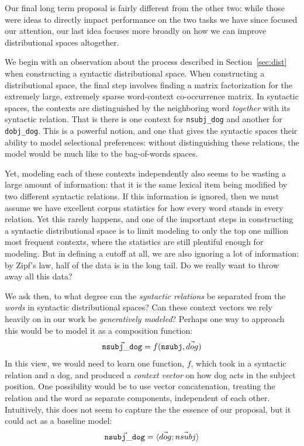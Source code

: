 \documentclass[12pt]{article}
\begin{document}
Our final long term proposal is fairly different from the other two: while
those were ideas to directly impact performance on the two tasks we have
since focused our attention, our last idea focuses more broadly on how
we can improve distributional spaces altogether.

We begin with an observation about the process described in
Section~\ref{sec:dist} when constructing a syntactic distributional space.
When constructing a distributional space, the final step involves finding a
matrix factorization for the extremely large, extremely sparse word-context
co-occurrence matrix. In syntactic spaces, the contexts are distinguished by
the neighboring word {\em together} with its syntactic relation. That is there
is one context for {\tt nsubj\_dog} and another for {\tt dobj\_dog}. This is a
powerful notion, and one that gives the syntactic spaces their ability
to model selectional preferences: without distinguishing these relations,
the model would be much like to the bag-of-words spaces.

Yet, modeling each of these contexts independently also seems to be wasting
a large amount of information: that it is the same lexical item being modified
by two different syntactic relations. If this information is ignored, then
we must assume we have excellent corpus statistics for how every word stands
in every relation. Yet this rarely happens, and one of the important
steps in constructing a syntactic distributional space is to limit modeling
to only the top one million most frequent contexts, where the statistics are
still plentiful enough for modeling. But in defining a cutoff at all, we
are also ignoring a lot of information: by Zipf's law, half of the data
is in the long tail. Do we really want to throw away all this data?

We ask then, to what degree can the {\em syntactic relations} be separated
from the {\em words} in syntactic distributional spaces? 
Can these context vectors we rely heavily on in our work be {\em generatively
modeled}? Perhaps one way to approach this would be to model it as a
composition function:
\begin{equation*}
  \vec{ {\tt nsubj\_dog} } = f({\tt nsubj}, \vec{dog})
\end{equation*}
In this view, we would need to learn one function, $f$, which took in a syntactic
relation and a dog, and produced a {\em context vector} on how dog acts in the
subject position. One possibility would be to use vector concatenation,
treating the relation and the word as separate components, independent of each
other. Intuitively, this does not seem to capture the the essence of our
proposal, but it could act as a baseline model:
\begin{equation*}
  \vec{ {\tt nsubj\_dog} } = \langle \vec{dog} ; \vec{nsubj} \rangle
\end{equation*}
\end{document}
